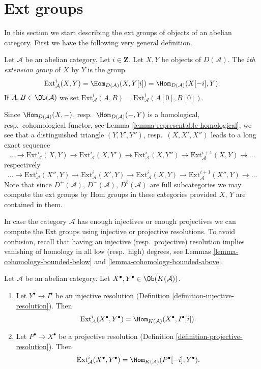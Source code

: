 \section{Ext groups}
\label{section-ext}

\noindent
In this section we start describing the ext groups of objects
of an abelian category. First we have the following very general
definition.

\begin{definition}
\label{definition-ext}
Let $\mathcal{A}$ be an abelian category. Let $i \in \mathbf{Z}$. Let
$X, Y$ be objects of $D(\mathcal{A})$. The {\it $i$th extension group}
of $X$ by $Y$ is the group
$$
\text{Ext}^i_\mathcal{A}(X, Y) =
\Hom_{D(\mathcal{A})}(X, Y[i]) =
\Hom_{D(\mathcal{A})}(X[-i], Y).
$$
If $A, B \in \Ob(\mathcal{A})$ we set
$\text{Ext}^i_\mathcal{A}(A, B) = \text{Ext}^i_\mathcal{A}(A[0], B[0])$.
\end{definition}

\noindent
Since $\Hom_{D(\mathcal{A})}(X, -)$,
resp.\ $\Hom_{D(\mathcal{A})}(-, Y)$ is a homological,
resp.\ cohomological functor, see
Lemma \ref{lemma-representable-homological},
we see that a distinguished triangle $(Y, Y', Y'')$,
resp.\ $(X, X', X'')$ leads to a long exact sequence
$$
\ldots \to
\text{Ext}^i_\mathcal{A}(X, Y) \to
\text{Ext}^i_\mathcal{A}(X, Y') \to
\text{Ext}^i_\mathcal{A}(X, Y'') \to
\text{Ext}^{i + 1}_\mathcal{A}(X, Y) \to \ldots
$$
respectively
$$
\ldots \to
\text{Ext}^i_\mathcal{A}(X'', Y) \to
\text{Ext}^i_\mathcal{A}(X', Y) \to
\text{Ext}^i_\mathcal{A}(X, Y) \to
\text{Ext}^{i + 1}_\mathcal{A}(X'', Y) \to \ldots
$$
Note that since $D^+(\mathcal{A})$, $D^-(\mathcal{A})$, $D^b(\mathcal{A})$
are full subcategories we may compute the ext groups by Hom groups
in these categories provided $X$, $Y$ are contained in them.

\noindent
In case the category $\mathcal{A}$ has enough injectives or enough
projectives we can compute the Ext groups using injective or
projective resolutions. To avoid confusion, recall that having an
injective (resp.\ projective) resolution implies vanishing of homology
in all low (resp.\ high) degrees, see
Lemmas \ref{lemma-cohomology-bounded-below} and
\ref{lemma-cohomology-bounded-above}.

\begin{lemma}
\label{lemma-compute-ext-resolutions}
Let $\mathcal{A}$ be an abelian category.
Let $X^\bullet, Y^\bullet \in \Ob(K(\mathcal{A}))$.
\begin{enumerate}
\item Let $Y^\bullet \to I^\bullet$ be an injective resolution
(Definition \ref{definition-injective-resolution}). Then
$$
\text{Ext}^i_\mathcal{A}(X^\bullet, Y^\bullet) =
\Hom_{K(\mathcal{A})}(X^\bullet, I^\bullet[i]).
$$
\item Let $P^\bullet \to X^\bullet$ be a projective resolution
(Definition \ref{definition-projective-resolution}). Then
$$
\text{Ext}^i_\mathcal{A}(X^\bullet, Y^\bullet) =
\Hom_{K(\mathcal{A})}(P^\bullet[-i], Y^\bullet).
$$
\end{enumerate}
\end{lemma}

